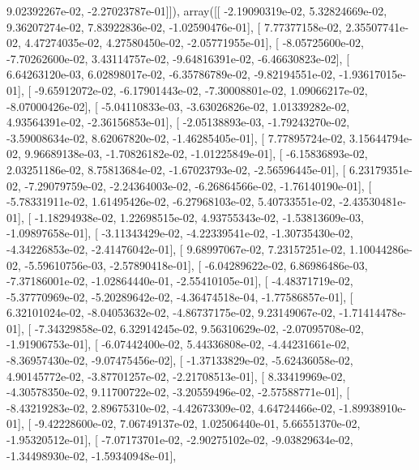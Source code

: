 \documentclass{article}
\begin{document}
          9.02392267e-02,  -2.27023787e-01]]), array([[ -2.19090319e-02,   5.32824669e-02,   9.36207274e-02,
          7.83922836e-02,  -1.02590476e-01],
       [  7.77377158e-02,   2.35507741e-02,   4.47274035e-02,
          4.27580450e-02,  -2.05771955e-01],
       [ -8.05725600e-02,  -7.70262600e-02,   3.43114757e-02,
         -9.64816391e-02,  -6.46630823e-02],
       [  6.64263120e-03,   6.02898017e-02,  -6.35786789e-02,
         -9.82194551e-02,  -1.93617015e-01],
       [ -9.65912072e-02,  -6.17901443e-02,  -7.30008801e-02,
          1.09066217e-02,  -8.07000426e-02],
       [ -5.04110833e-03,  -3.63026826e-02,   1.01339282e-02,
          4.93564391e-02,  -2.36156853e-01],
       [ -2.05138893e-03,  -1.79243270e-02,  -3.59008634e-02,
          8.62067820e-02,  -1.46285405e-01],
       [  7.77895724e-02,   3.15644794e-02,   9.96689138e-03,
         -1.70826182e-02,  -1.01225849e-01],
       [ -6.15836893e-02,   2.03251186e-02,   8.75813684e-02,
         -1.67023793e-02,  -2.56596445e-01],
       [  6.23179351e-02,  -7.29079759e-02,  -2.24364003e-02,
         -6.26864566e-02,  -1.76140190e-01],
       [ -5.78331911e-02,   1.61495426e-02,  -6.27968103e-02,
          5.40733551e-02,  -2.43530481e-01],
       [ -1.18294938e-02,   1.22698515e-02,   4.93755343e-02,
         -1.53813609e-03,  -1.09897658e-01],
       [ -3.11343429e-02,  -4.22339541e-02,  -1.30735430e-02,
         -4.34226853e-02,  -2.41476042e-01],
       [  9.68997067e-02,   7.23157251e-02,   1.10044286e-02,
         -5.59610756e-03,  -2.57890418e-01],
       [ -6.04289622e-02,   6.86986486e-03,  -7.37186001e-02,
         -1.02864440e-01,  -2.55410105e-01],
       [ -4.48371719e-02,  -5.37770969e-02,  -5.20289642e-02,
         -4.36474518e-04,  -1.77586857e-01],
       [  6.32101024e-02,  -8.04053632e-02,  -4.86737175e-02,
          9.23149067e-02,  -1.71414478e-01],
       [ -7.34329858e-02,   6.32914245e-02,   9.56310629e-02,
         -2.07095708e-02,  -1.91906753e-01],
       [ -6.07442400e-02,   5.44336808e-02,  -4.44231661e-02,
         -8.36957430e-02,  -9.07475456e-02],
       [ -1.37133829e-02,  -5.62436058e-02,   4.90145772e-02,
         -3.87701257e-02,  -2.21708513e-01],
       [  8.33419969e-02,  -4.30578350e-02,   9.11700722e-02,
         -3.20559496e-02,  -2.57588771e-01],
       [ -8.43219283e-02,   2.89675310e-02,  -4.42673309e-02,
          4.64724466e-02,  -1.89938910e-01],
       [ -9.42228600e-02,   7.06749137e-02,   1.02506440e-01,
          5.66551370e-02,  -1.95320512e-01],
       [ -7.07173701e-02,  -2.90275102e-02,  -9.03829634e-02,
         -1.34498930e-02,  -1.59340948e-01],
\end{document}
